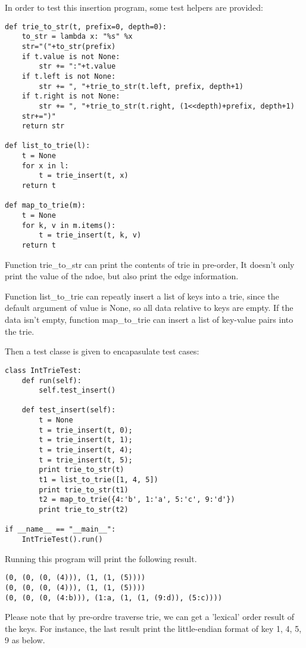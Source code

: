 \documentclass{article}
\begin{document}
In order to test this insertion program, some test helpers are provided:

\begin{lstlisting}
def trie_to_str(t, prefix=0, depth=0):
    to_str = lambda x: "%s" %x
    str="("+to_str(prefix)
    if t.value is not None:
        str += ":"+t.value
    if t.left is not None:
        str += ", "+trie_to_str(t.left, prefix, depth+1)
    if t.right is not None:
        str += ", "+trie_to_str(t.right, (1<<depth)+prefix, depth+1)
    str+=")"
    return str

def list_to_trie(l):
    t = None
    for x in l:
        t = trie_insert(t, x)
    return t

def map_to_trie(m):
    t = None
    for k, v in m.items():
        t = trie_insert(t, k, v)
    return t
\end{lstlisting}

Function trie\_to\_str can print the contents of trie in pre-order,
It doesn't only print the value of the ndoe, but also print the edge information.

Function list\_to\_trie can repeatly insert a list of keys into a trie, since the
default argument of value is None, so all data relative to keys are empty. If the
data isn't empty, function map\_to\_trie can insert a list of key-value pairs into 
the trie.

Then a test classe is given to encapasulate test cases:

\begin{lstlisting}
class IntTrieTest:
    def run(self):
        self.test_insert()

    def test_insert(self):
        t = None
        t = trie_insert(t, 0);
        t = trie_insert(t, 1);
        t = trie_insert(t, 4);
        t = trie_insert(t, 5);
        print trie_to_str(t)
        t1 = list_to_trie([1, 4, 5])
        print trie_to_str(t1)
        t2 = map_to_trie({4:'b', 1:'a', 5:'c', 9:'d'})
        print trie_to_str(t2)

if __name__ == "__main__":
    IntTrieTest().run()
\end{lstlisting}

Running this program will print the following result.

\begin{verbatim}
(0, (0, (0, (4))), (1, (1, (5))))
(0, (0, (0, (4))), (1, (1, (5))))
(0, (0, (0, (4:b))), (1:a, (1, (1, (9:d)), (5:c))))
\end{verbatim}

Please note that by pre-ordre traverse trie, we can get a 'lexical' order
result of the keys. For instance, the last result print the little-endian
format of key 1, 4, 5, 9 as below.
\end{document}
